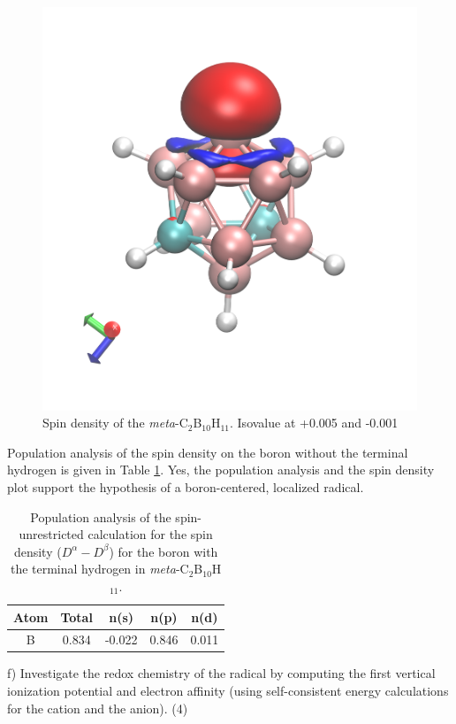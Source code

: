 \documentclass{article}
\begin{document}
\begin{figure}[H]
  \centering
  \includegraphics[scale=0.1]{spin_dens.png}
  \caption{Spin density of the \textit{meta}-C$_2$B$_{10}$H$_{11}$.
    Isovalue at +0.005 and -0.001}
  \label{fig:spin}
\end{figure}

{\color{blue} Population analysis of the spin density on the boron without
  the terminal hydrogen is given in Table \ref{tab:pop}. Yes, the population
  analysis and the spin density plot support the hypothesis of a boron-centered,
  localized radical.
}

\begin{table}[H]
  \centering
  \caption{Population analysis of the spin-unrestricted calculation
    for the spin density ($D^{\alpha}-D^{\beta}$) for the boron with the
    terminal hydrogen in \textit{meta}-C$_2$B$_{10}$H$_{11}$.}
  \begin{tabular}{ccccc}
    Atom & Total & n(s) & n(p) & n(d) \\
    \hline
    B & 0.834 & -0.022 & 0.846 & 0.011
  \end{tabular}
  \label{tab:pop}
\end{table}

\noindent f) Investigate the redox chemistry of the radical by computing
the first vertical ionization potential and electron affinity (using
self-consistent energy calculations for the cation and the anion). (4)
\\
\end{document}
